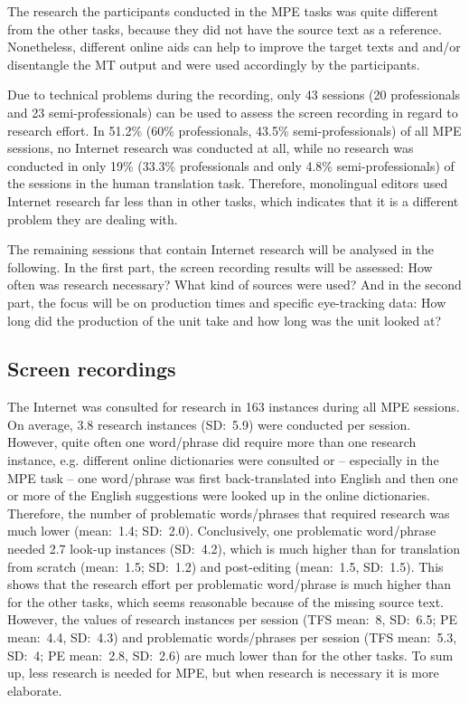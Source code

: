 \documentclass[output=paper]{langsci/langscibook}
\begin{document}
The research the participants conducted in the MPE tasks was quite different from the other tasks, because they did not have the source text as a reference. Nonetheless, different online aids can help to improve the target texts and and/or disentangle the MT output and were used accordingly by the participants.


Due to technical problems during the recording, only 43 sessions (20 professionals and 23 semi-professionals) can be used to assess the screen recording in regard to research effort. In 51.2\% (60\% professionals, 43.5\% semi-professionals) of all MPE sessions, no Internet research was conducted at all, while no research was conducted in only 19\% (33.3\% professionals and only 4.8\% semi-professionals) of the sessions in the human translation task. Therefore, monolingual editors used Internet research far less than in other tasks, which indicates that it is a different problem they are dealing with.



The remaining sessions that contain Internet research will be analysed in the following. In the first part, the screen recording results will be assessed: How often was research necessary? What kind of sources were used? And in the second part, the focus will be on production times and specific eye-tracking data: How long did the production of the unit take and how long was the unit looked at?


\subsection{Screen recordings\label{nitzke:sec:ScreenRecordings}}

The Internet was consulted for research in 163 instances during all MPE sessions. On average, 3.8 research instances (SD:~5.9) were conducted per session. However, quite often one word/phrase did require more than one research instance, e.g. different online dictionaries were consulted or -- especially in the MPE task -- one word/phrase was first back-translated into English and then one or more of the English suggestions were looked up in the online dictionaries. Therefore, the number of problematic words/phrases that required research was much lower (mean:~1.4; SD:~2.0). Conclusively, one problematic word/phrase needed 2.7 look-up instances (SD:~4.2), which is much higher than for translation from scratch (mean:~1.5; SD:~1.2) and post-editing (mean:~1.5, SD:~1.5). This shows that the research effort per problematic word/phrase is much higher than for the other tasks, which seems reasonable because of the missing source text. However, the values of research instances per session (TFS mean:~8, SD:~6.5; PE mean:~4.4, SD:~4.3) and problematic words/phrases per session (TFS mean:~5.3, SD:~4; PE mean:~2.8, SD:~2.6) are much lower than for the other tasks. To sum up, less research is needed for MPE, but when research is necessary it is more elaborate.
\end{document}
